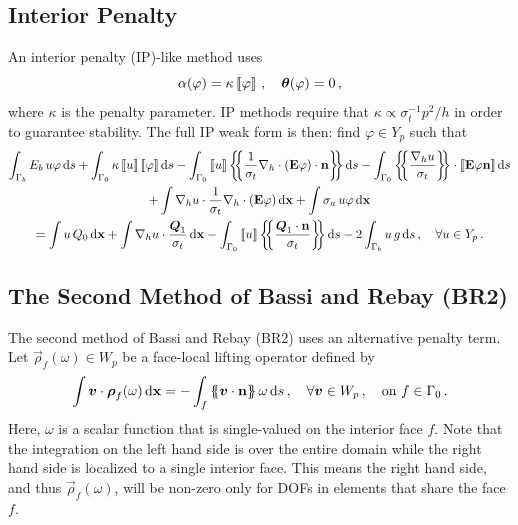 \documentclass[../doc.tex]{subfiles}
\begin{document}
\subsection{Interior Penalty} \label{dgvef_sec:ip}
An interior penalty (IP)-like method uses 
	\begin{equation}
		\alpha(\varphi) = \kappa \left\llbracket\varphi \right\rrbracket \,, \quad \boldsymbol{\theta}(\varphi) = 0 \,, 
	\end{equation}
where $\kappa$ is the penalty parameter. IP methods require that $\kappa \propto \sigma_t^{-1} p^2/h$ in order to guarantee stability. The full IP weak form is then: find $\varphi \in Y_p$ such that 
	\begin{multline} \label{dgvef:ip}
		\int_{\Gamma_b} E_b\, u \varphi \ud s + \int_{\Gamma_0} \kappa \jump{u} \jump{\varphi} \ud s - \int_{\Gamma_0} \jump{u} \avg{\frac{1}{\sigma_t}\nablah\cdot\paren{\E\varphi}\cdot\n} \ud s - \int_{\Gamma_0} \avg{\frac{\nablah u}{\sigma_t}} \cdot \jump{\E\varphi\n} \ud s \\
		+ \int \nablah u \cdot \frac{1}{\sigma_t}\nablah\cdot\paren{\E\varphi} \ud \x + \int \sigma_a\, u \varphi \ud \x \\ 
		= \int u\, Q_0 \ud \x + \int \nablah u \cdot \frac{\vec{Q}_1}{\sigma_t} \ud \x - \int_{\Gamma_0} \jump{u} \avg{\frac{\vec{Q}_1\cdot\n}{\sigma_t}} \ud s - 2\int_{\Gamma_b} u\, g \ud s \,, \quad \forall u \in Y_p \,. 
	\end{multline}

\subsection{The Second Method of Bassi and Rebay (BR2)}
The second method of Bassi and Rebay (BR2) uses an alternative penalty term. Let $\vec{\rho}_f(\omega)\in W_p$ be a face-local lifting operator defined by 
	\begin{equation} \label{dgvef:rhof}
		\int \boldsymbol{v}\cdot\boldsymbol{\rho}_f(\omega) \mathop{}\!\mathrm{d} \boldsymbol{\mathrm{x}} = -\int_f \left\{\!\!\left\{\boldsymbol{v} \cdot\boldsymbol{\mathrm{n}}\right\}\!\!\right\} \omega \mathop{}\!\mathrm{d} s \,, \quad \forall \boldsymbol{v} \in W_p\,, \quad \text{on} \ f\in \Gamma_0 \,. 
	\end{equation}
Here, $\omega$ is a scalar function that is single-valued on the interior face $f$. Note that the integration on the left hand side is over the entire domain while the right hand side is localized to a single interior face. This means the right hand side, and thus $\vec{\rho}_f(\omega)$, will be non-zero only for DOFs in elements that share the face $f$. 
\end{document}
